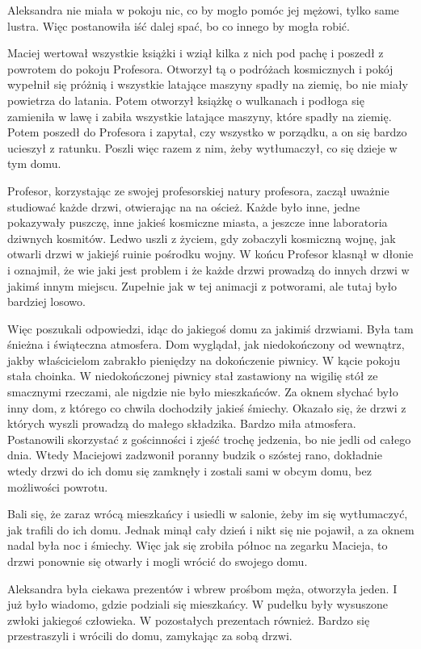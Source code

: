 Aleksandra nie miała w pokoju nic, co by mogło pomóc jej mężowi, tylko same lustra.
Więc postanowiła iść dalej spać, bo co innego by mogła robić.

Maciej wertował wszystkie książki i wziął kilka z nich pod pachę i poszedł z powrotem do pokoju Profesora.
Otworzył tą o podróżach kosmicznych i pokój wypełnił się próżnią i wszystkie latające maszyny spadły na ziemię, bo nie miały powietrza do latania.
Potem otworzył książkę o wulkanach i podłoga się zamieniła w lawę i zabiła wszystkie latające maszyny, które spadły na ziemię.
Potem poszedł do Profesora i zapytał, czy wszystko w porządku, a on się bardzo ucieszył z ratunku.
Poszli więc razem z nim, żeby wytłumaczył, co się dzieje w tym domu.

Profesor, korzystając ze swojej profesorskiej natury profesora, zaczął uważnie studiować każde drzwi, otwierając na na oścież. Każde było inne, jedne pokazywały puszczę, inne jakieś kosmiczne miasta, a jeszcze inne laboratoria dziwnych kosmitów. Ledwo uszli z życiem, gdy zobaczyli kosmiczną wojnę, jak otwarli drzwi w jakiejś ruinie pośrodku wojny. W końcu Profesor klasnął w dłonie i oznajmił, że wie jaki jest problem i że każde drzwi prowadzą do innych drzwi w jakimś innym miejscu. Zupełnie jak w tej animacji z potworami, ale tutaj było bardziej losowo.

Więc poszukali odpowiedzi, idąc do jakiegoś domu za jakimiś drzwiami.
Była tam śnieżna i świąteczna atmosfera. Dom wyglądał, jak niedokończony od wewnątrz, 
jakby właścicielom zabrakło pieniędzy na dokończenie piwnicy. 
W kącie pokoju stała choinka.
W niedokończonej piwnicy stał zastawiony na wigilię stół ze smacznymi rzeczami, ale nigdzie nie było mieszkańców. 
Za oknem słychać było inny dom, z którego co chwila dochodziły jakieś śmiechy.
Okazało się, że drzwi z których wyszli prowadzą do małego składzika.
Bardzo miła atmosfera. 
Postanowili skorzystać z gościnności i zjeść trochę jedzenia, bo nie jedli od całego dnia.
Wtedy Maciejowi zadzwonił poranny budzik o szóstej rano, dokładnie wtedy drzwi do ich domu się zamknęły i zostali sami w obcym domu, bez możliwości powrotu.

Bali się, że zaraz wrócą mieszkańcy i usiedli w salonie, żeby im się wytłumaczyć, jak trafili do ich domu.
Jednak minął cały dzień i nikt się nie pojawił, a za oknem nadal była noc i śmiechy.
Więc jak się zrobiła północ na zegarku Macieja, to drzwi ponownie się otwarły i mogli wrócić do swojego domu.

Aleksandra była ciekawa prezentów i wbrew prośbom męża, otworzyła jeden.
I już było wiadomo, gdzie podziali się mieszkańcy.
W pudełku były wysuszone zwłoki jakiegoś człowieka.
W pozostałych prezentach również.
Bardzo się przestraszyli i wrócili do domu, zamykając za sobą drzwi.

